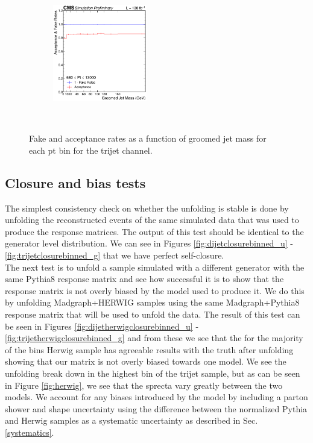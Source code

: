 \begin{figure}[htp!]
        \begin{subfigure}
          \centering
          \includegraphics[width=0.45\textwidth]{figures/multijet/trijet/fakerates_groomed_3.pdf}
        \end{subfigure} \\
	\caption{Fake and acceptance rates as a function of groomed jet mass for each pt bin for the trijet channel.}
	\label{fig:fakeratesbinned_trijet_g}
      \end{figure}
      
      \subsection{Closure and bias tests}
      The simplest consistency check on whether the unfolding is stable is done by unfolding the reconstructed events of the same simulated data that was used to produce the response matrices. The output of this test should be identical to the generator level distribution. We can see in Figures \ref{fig:dijetclosurebinned_u} - \ref{fig:trijetclosurebinned_g} that we have perfect self-closure.\\
        The next test is to unfold a sample simulated with a different generator with the same Pythia8 response matrix and see how successful it is to show that the response matrix is not overly biased by the model used to produce it. We do this by unfolding Madgraph+HERWIG samples using the same Madgraph+Pythia8 response matrix that will be used to unfold the data. The result of this test can be seen in Figures \ref{fig:dijetherwigclosurebinned_u} - \ref{fig:trijetherwigclosurebinned_g} and from these we see that the for the majority of the bins Herwig sample has agreeable results with the truth after unfolding showing that our matrix is not overly biased towards one model. We see the unfolding break down in the highest bin of the trijet sample, but as can be seen in Figure \ref{fig:herwig}, we see that the \pt sprecta vary greatly between the two models. We account for any biases introduced by the model by including a parton shower and shape uncertainty using the difference between the normalized Pythia and Herwig samples as a systematic uncertainty as described in Sec. \ref{systematics}.
      
